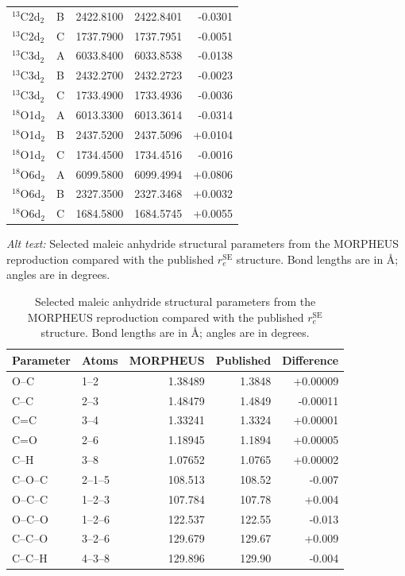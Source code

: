 \documentclass[12pt]{article}
\begin{document}
\begin{longtable}{llrrr}
$^{13}$C2d$_2$ & B & 2422.8100 & 2422.8401 & -0.0301 \\
$^{13}$C2d$_2$ & C & 1737.7900 & 1737.7951 & -0.0051 \\
$^{13}$C3d$_2$ & A & 6033.8400 & 6033.8538 & -0.0138 \\
$^{13}$C3d$_2$ & B & 2432.2700 & 2432.2723 & -0.0023 \\
$^{13}$C3d$_2$ & C & 1733.4900 & 1733.4936 & -0.0036 \\
$^{18}$O1d$_2$ & A & 6013.3300 & 6013.3614 & -0.0314 \\
$^{18}$O1d$_2$ & B & 2437.5200 & 2437.5096 & +0.0104 \\
$^{18}$O1d$_2$ & C & 1734.4500 & 1734.4516 & -0.0016 \\
$^{18}$O6d$_2$ & A & 6099.5800 & 6099.4994 & +0.0806 \\
$^{18}$O6d$_2$ & B & 2327.3500 & 2327.3468 & +0.0032 \\
$^{18}$O6d$_2$ & C & 1684.5800 & 1684.5745 & +0.0055 \\
\bottomrule
\end{longtable}

\begin{table}
\caption{Selected maleic anhydride structural parameters from the MORPHEUS
reproduction compared with the published $r_e^\mathrm{SE}$ structure. Bond
lengths are in \AA; angles are in degrees.}
\label{tab:si-maleic-geometry}
\par\smallskip\noindent\textit{Alt text:} Selected maleic anhydride structural parameters from the MORPHEUS reproduction compared with the published $r_e^\mathrm{SE}$ structure. Bond lengths are in \AA; angles are in degrees.
\begin{tabular}{llrrr}
\toprule
Parameter & Atoms & MORPHEUS & Published & Difference \\
\midrule
O--C & 1--2 & 1.38489 & 1.3848 & +0.00009 \\
C--C & 2--3 & 1.48479 & 1.4849 & -0.00011 \\
C=C & 3--4 & 1.33241 & 1.3324 & +0.00001 \\
C=O & 2--6 & 1.18945 & 1.1894 & +0.00005 \\
C--H & 3--8 & 1.07652 & 1.0765 & +0.00002 \\
C--O--C & 2--1--5 & 108.513 & 108.52 & -0.007 \\
O--C--C & 1--2--3 & 107.784 & 107.78 & +0.004 \\
O--C--O & 1--2--6 & 122.537 & 122.55 & -0.013 \\
C--C--O & 3--2--6 & 129.679 & 129.67 & +0.009 \\
C--C--H & 4--3--8 & 129.896 & 129.90 & -0.004 \\
\bottomrule
\end{tabular}
\end{table}
\end{document}
